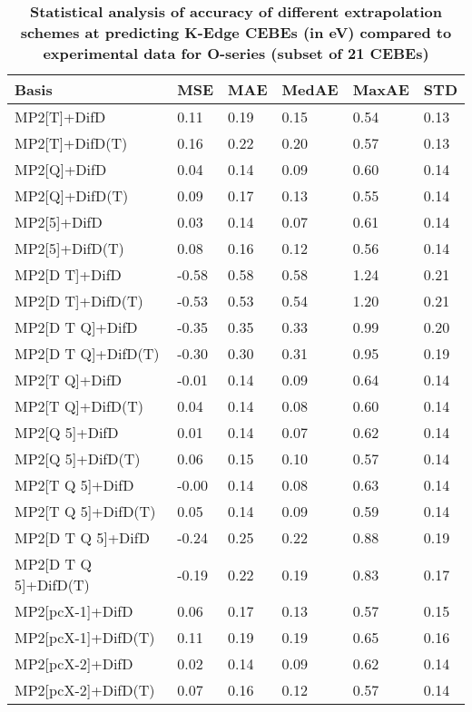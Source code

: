\begin{table}
  \caption{\textbf{Statistical analysis of accuracy of different extrapolation schemes at predicting K-Edge CEBEs (in eV) compared to experimental data for O-series (subset of 21 CEBEs)}}
  \begin{tabular}{l l l l l l }
    \toprule
    \textbf{Basis} & \textbf{MSE} & \textbf{MAE} & \textbf{MedAE} & \textbf{MaxAE} & \textbf{STD} \\ 
    \midrule
    MP2[T]+DifD & 0.11 & 0.19 & 0.15 & 0.54 & 0.13 \\ 
    MP2[T]+DifD(T) & 0.16 & 0.22 & 0.20 & 0.57 & 0.13 \\ 
    MP2[Q]+DifD & 0.04 & 0.14 & 0.09 & 0.60 & 0.14 \\ 
    MP2[Q]+DifD(T) & 0.09 & 0.17 & 0.13 & 0.55 & 0.14 \\ 
    MP2[5]+DifD & 0.03 & 0.14 & 0.07 & 0.61 & 0.14 \\ 
    MP2[5]+DifD(T) & 0.08 & 0.16 & 0.12 & 0.56 & 0.14 \\ 
    MP2[D T]+DifD & -0.58 & 0.58 & 0.58 & 1.24 & 0.21 \\ 
    MP2[D T]+DifD(T) & -0.53 & 0.53 & 0.54 & 1.20 & 0.21 \\ 
    MP2[D T Q]+DifD & -0.35 & 0.35 & 0.33 & 0.99 & 0.20 \\ 
    MP2[D T Q]+DifD(T) & -0.30 & 0.30 & 0.31 & 0.95 & 0.19 \\ 
    MP2[T Q]+DifD & -0.01 & 0.14 & 0.09 & 0.64 & 0.14 \\ 
    MP2[T Q]+DifD(T) & 0.04 & 0.14 & 0.08 & 0.60 & 0.14 \\ 
    MP2[Q 5]+DifD & 0.01 & 0.14 & 0.07 & 0.62 & 0.14 \\ 
    MP2[Q 5]+DifD(T) & 0.06 & 0.15 & 0.10 & 0.57 & 0.14 \\ 
    MP2[T Q 5]+DifD & -0.00 & 0.14 & 0.08 & 0.63 & 0.14 \\ 
    MP2[T Q 5]+DifD(T) & 0.05 & 0.14 & 0.09 & 0.59 & 0.14 \\ 
    MP2[D T Q 5]+DifD & -0.24 & 0.25 & 0.22 & 0.88 & 0.19 \\ 
    MP2[D T Q 5]+DifD(T) & -0.19 & 0.22 & 0.19 & 0.83 & 0.17 \\ 
    MP2[pcX-1]+DifD & 0.06 & 0.17 & 0.13 & 0.57 & 0.15 \\ 
    MP2[pcX-1]+DifD(T) & 0.11 & 0.19 & 0.19 & 0.65 & 0.16 \\ 
    MP2[pcX-2]+DifD & 0.02 & 0.14 & 0.09 & 0.62 & 0.14 \\ 
    MP2[pcX-2]+DifD(T) & 0.07 & 0.16 & 0.12 & 0.57 & 0.14 \\ 

\end{tabular}
\end{table}
